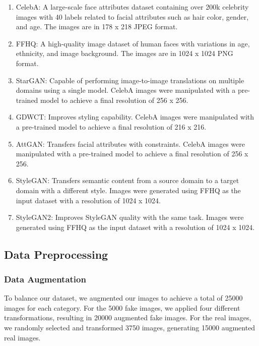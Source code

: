         \begin{enumerate}
            \item CelebA\cite{7410782}: A large-scale face attributes dataset containing over 200k celebrity images with 40 labels related to facial attributes such as hair color, gender, and age. The images are in 178 x 218 JPEG format.
            
            \item FFHQ\cite{NVlabs_ffhq_dataset}: A high-quality image dataset of human faces with variations in age, ethnicity, and image background. The images are in 1024 x 1024 PNG format.
            
            \item StarGAN\cite{choi2018stargan}: Capable of performing image-to-image translations on multiple domains using a single model. CelebA images were manipulated with a pre-trained model to achieve a final resolution of 256 x 256.
            
            \item GDWCT\cite{cho2019imagetoimage}: Improves styling capability. CelebA images were manipulated with a pre-trained model to achieve a final resolution of 216 x 216.
    
            \item AttGAN\cite{8718508}: Transfers facial attributes with constraints. CelebA images were manipulated with a pre-trained model to achieve a final resolution of 256 x 256.
        
            \item StyleGAN\cite{Karras_2020_CVPR}: Transfers semantic content from a source domain to a target domain with a different style. Images were generated using FFHQ as the input dataset with a resolution of 1024 x 1024.
        
            \item StyleGAN2\cite{inproceedings}: Improves StyleGAN quality with the same task. Images were generated using FFHQ as the input dataset with a resolution of 1024 x 1024.
        \end{enumerate}
        
        \subsection{Data Preprocessing}
        \label{sec: above}
        \subsubsection{Data Augmentation}
            To balance our dataset, we augmented our images to achieve a total of 25000 images for each category. For the 5000 fake images, we applied four different transformations, resulting in 20000 augmented fake images. For the real images, we randomly selected and transformed 3750 images, generating 15000 augmented real images.

